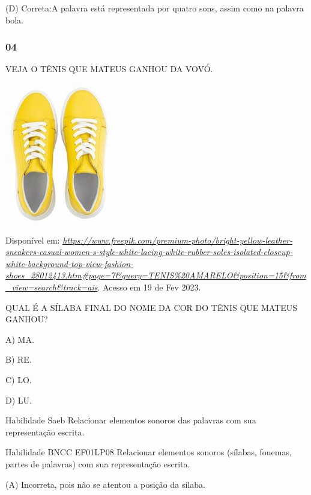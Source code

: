 \begin{escola}
(D) Correta:A palavra está representada por quatro sons, assim como na
palavra bola.

\subsubsection{04}\label{section-29}

\protect\hypertarget{_heading=h.1hmsyys}{}{}VEJA O TÊNIS QUE MATEUS
GANHOU DA VOVÓ.

\includegraphics[width=1.87986in,height=2.41667in]{media/image189.jpg}

Disponível em:
\href{https://www.freepik.com/premium-photo/bright-yellow-leather-sneakers-casual-women-s-style-white-lacing-white-rubber-soles-isolated-closeup-white-background-top-view-fashion-shoes_28012413.htm\#page=7\&query=TENIS\%20AMARELO\&position=15\&from_view=search\&track=ais}{\emph{https://www.freepik.com/premium-photo/bright-yellow-leather-sneakers-casual-women-s-style-white-lacing-white-rubber-soles-isolated-closeup-white-background-top-view-fashion-shoes\_28012413.htm\#page=7\&query=TENIS\%20AMARELO\&position=15\&from\_view=search\&track=ais}}.
Acesso em 19 de Fev 2023.

QUAL É A SÍLABA FINAL DO NOME DA COR DO TÊNIS QUE MATEUS GANHOU?

A) MA.

B) RE.

C) LO.

D) LU.

\protect\hypertarget{_heading=h.41mghml}{}{}Habilidade Saeb Relacionar
elementos sonoros das palavras com sua representação escrita.

Habilidade BNCC EF01LP08 Relacionar elementos sonoros (sílabas, fonemas,
partes de palavras) com sua representação escrita.

\protect\hypertarget{_heading=h.2grqrue}{}{}(A) Incorreta, pois não se
atentou a posição da sílaba.


\end{escola}
